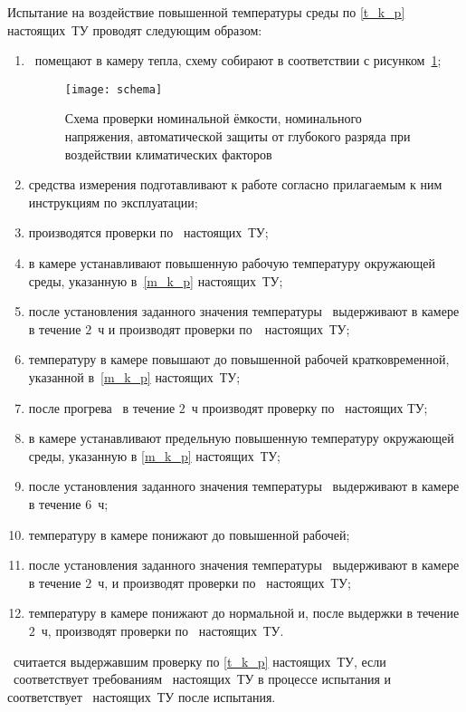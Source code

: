 Испытание на воздействие повышенной температуры среды по \ref{t_k_p} настоящих~ТУ проводят следующим образом:
%
\begin{enumerate}
	\item \dut \  помещают в камеру тепла, схему собирают в соответствии с рисунком~\ref{fig:capacity_camera};
			\begin{figure}[!htb]
			\centering
			\texttt{[image: schema]}
			\begin{picdescription}[label={E\arabic* ---}, ref={E\arabic*}, before={\vspace{0pt}\small}]
				\item \hyperref[e:cable]{Жгут \cableRN}.
			\end{picdescription}
			\caption{Схема проверки номинальной ёмкости, номинального напряжения, автоматической защиты от глубокого разряда при воздействии климатических факторов}
			\label{fig:capacity_camera}
		\end{figure}
	\item средства измерения подготавливают к работе согласно прилагаемым к ним инструкциям по эксплуатации;
	\item производятся проверки по \treb \ настоящих~ТУ;
	\item в камере устанавливают повышенную рабочую температуру окружающей среды, указанную в~\ref{m_k_p} настоящих~ТУ; 
	\item после установления заданного значения температуры \dut \ выдерживают в камере в течение $2$~ч и производят проверки по~\treb \ настоящих~ТУ;
	\item температуру в камере повышают до повышенной рабочей кратковременной, указанной в~\ref{m_k_p} настоящих~ТУ;
	\item после прогрева \dut \ в течение $2$~ч производят проверку по \treb \ настоящих ТУ;
	\item в камере устанавливают предельную повышенную температуру окружающей среды, указанную в \ref{m_k_p} настоящих~ТУ; 
	\item после установления заданного значения температуры \dut \ выдерживают в камере в течение $6$~ч;
	\item температуру в камере понижают до повышенной рабочей;
	\item после установления заданного значения температуры \dut \ выдерживают в камере в течение $2$~ч, и производят проверки по \treb \ настоящих~ТУ;
	\item температуру  в  камере  понижают  до  нормальной  и,  после выдержки в течение $2$~ч, производят проверки по \trebafter \ настоящих~ТУ.
\end{enumerate}

\dut \  считается выдержавшим проверку по \ref{t_k_p} настоящих~ТУ, если \dut \  соответствует требованиям \treb \ настоящих~ТУ в процессе испытания и соответствует \trebafter \ настоящих~ТУ после испытания.
